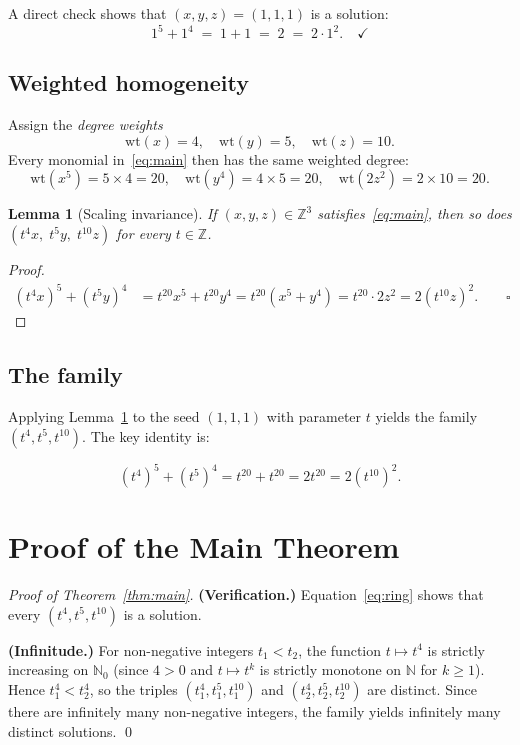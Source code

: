 \documentclass[12pt,a4paper]{article}
\newtheorem{lemma}[theorem]{Lemma}
\theoremstyle{definition}
\newcommand{\Z}{\mathbb{Z}}
\newcommand{\N}{\mathbb{N}}
\begin{document}
A direct check shows that $(x, y, z) = (1, 1, 1)$ is a solution:
\[
  1^5 + 1^4 \;=\; 1 + 1 \;=\; 2 \;=\; 2\cdot 1^2. \quad\checkmark
\]

\subsection{Weighted homogeneity}

Assign the \emph{degree weights}
\[
  \mathrm{wt}(x) = 4, \quad \mathrm{wt}(y) = 5, \quad \mathrm{wt}(z) = 10.
\]
Every monomial in~\eqref{eq:main} then has the same weighted degree:
\[
  \mathrm{wt}(x^5) = 5 \times 4 = 20, \quad
  \mathrm{wt}(y^4) = 4 \times 5 = 20, \quad
  \mathrm{wt}(2z^2) = 2 \times 10 = 20.
\]

\begin{lemma}[Scaling invariance]\label{lem:scale}
  If $(x, y, z) \in \Z^3$ satisfies~\eqref{eq:main}, then so does
  $(t^4 x,\; t^5 y,\; t^{10} z)$ for every $t \in \Z$.
\end{lemma}

\begin{proof}
  \begin{align*}
    (t^4 x)^5 + (t^5 y)^4
    &= t^{20} x^5 + t^{20} y^4
     = t^{20}(x^5 + y^4)
     = t^{20} \cdot 2z^2
     = 2(t^{10} z)^2. \qquad\square
  \end{align*}
\end{proof}

\subsection{The family}

Applying Lemma~\ref{lem:scale} to the seed $(1, 1, 1)$ with parameter $t$ yields
the family $(t^4, t^5, t^{10})$.  The key identity is:

\begin{equation}\label{eq:ring}
  (t^4)^5 + (t^5)^4
  = t^{20} + t^{20}
  = 2t^{20}
  = 2(t^{10})^2.
\end{equation}

\section{Proof of the Main Theorem}\label{sec:proof}

\begin{proof}[Proof of Theorem~\ref{thm:main}]
  \textbf{(Verification.)} Equation~\eqref{eq:ring} shows that every
  $(t^4, t^5, t^{10})$ is a solution.

  \textbf{(Infinitude.)} For non-negative integers $t_1 < t_2$, the
  function $t \mapsto t^4$ is strictly increasing on $\N_0$ (since $4 > 0$
  and $t \mapsto t^k$ is strictly monotone on $\N$ for $k \geq 1$).
  Hence $t_1^4 < t_2^4$, so the triples $(t_1^4, t_1^5, t_1^{10})$ and
  $(t_2^4, t_2^5, t_2^{10})$ are distinct.  Since there are infinitely many
  non-negative integers, the family yields infinitely many distinct solutions.%
  \qed
\end{proof}
\end{document}
